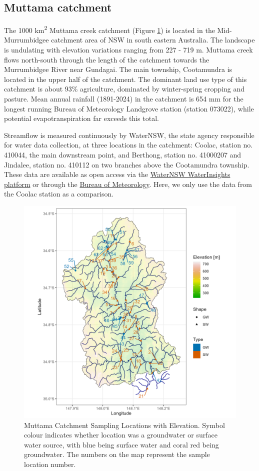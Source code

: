 \documentclass[, manuscript]{copernicus}
\begin{document}
\subsection{Muttama catchment}

The 1000 km\textsuperscript{2} Muttama creek catchment (Figure
\ref{fig:samplemap}) is located in the Mid-Murrumbidgee catchment area
of NSW in south eastern Australia. The landscape is undulating with
elevation variations ranging from 227 - 719 m. Muttama creek flows
north-south through the length of the catchment towards the Murrumbidgee
River near Gundagai. The main township, Cootamundra is located in the
upper half of the catchment. The dominant land use type of this
catchment is about 93\% agriculture, dominated by winter-spring cropping
and pasture. Mean annual rainfall (1891-2024) in the catchment is 654 mm
for the longest running Bureau of Meteorology Landgrove station (station
073022), while potential evapotranspiration far exceeds this total.

Streamflow is measured continuously by WaterNSW, the state agency
responsible for water data collection, at three locations in the
catchment: Coolac, station no. 410044, the main downstream point, and
Berthong, station no. 41000207 and Jindalee, station no. 410112 on two
branches above the Cootamundra township. These data are available as
open access via the
\href{https://waterinsights.waternsw.com.au/}{WaterNSW WaterInsights
platform} or through the \href{http://bom.gov.au/waterdata/}{Bureau of
Meteorology}. Here, we only use the data from the Coolac station as a
comparison.

\begin{figure}
\includegraphics[width=0.8\linewidth]{Figures/gw_or_sw_map} \caption{Muttama Catchment Sampling Locations with Elevation. Symbol colour indicates whether location was a groundwater or surface water source, with blue being surface water and coral red being groundwater. The numbers on the map represent the sample location number.}\label{fig:samplemap}
\end{figure}
\end{document}
